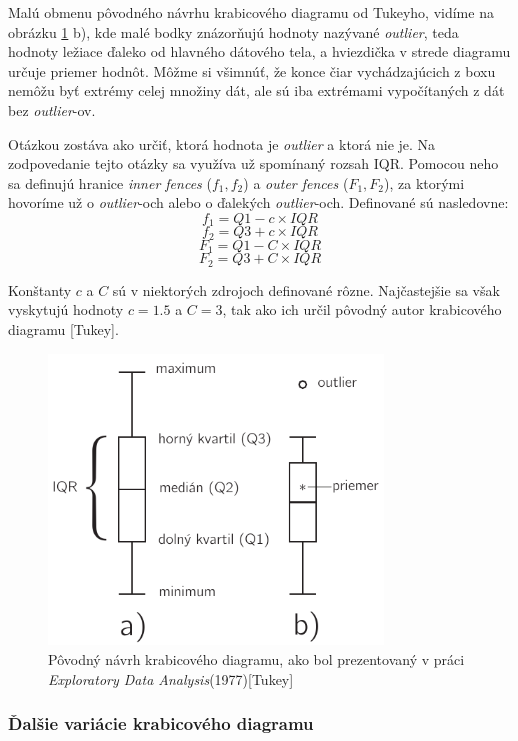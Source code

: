 Malú obmenu pôvodného návrhu krabicového diagramu od Tukeyho, vidíme na obrázku \ref{fig:boxplot} b), kde malé bodky znázorňujú hodnoty nazývané \textit{outlier}, teda hodnoty ležiace ďaleko od hlavného dátového tela, a hviezdička v strede diagramu určuje priemer hodnôt. Môžme si všimnúť, že konce čiar vychádzajúcich z boxu nemôžu byť extrémy celej množiny dát, ale sú iba extrémami vypočítaných z dát bez \textit{outlier}-ov.

Otázkou zostáva ako určiť, ktorá hodnota je \textit{outlier} a ktorá nie je. Na zodpovedanie tejto otázky sa využíva už spomínaný rozsah IQR. Pomocou neho sa definujú hranice \textit{inner fences} ($f_{1}, f_{2}$) a \textit{outer fences} ($F_{1}, F_{2}$), za ktorými hovoríme už o \textit{outlier}-och alebo o ďalekých \textit{outlier}-och. Definované sú nasledovne:
\\
\[f_{1} = Q1 - c \times IQR\]	
\[f_{2} = Q3 + c \times IQR\]
\[F_{1} = Q1 - C \times IQR\]
\[F_{2} = Q3 + C \times IQR\]

Konštanty $ c $ a $ C $ sú v niektorých zdrojoch definované rôzne. Najčastejšie sa však vyskytujú hodnoty $ c = 1.5 $ a $ C = 3$, tak ako ich určil pôvodný autor krabicového diagramu [Tukey].

\begin{figure}
	\centering
	\includegraphics[width = 3.5in]{boxplot}
	\caption{Pôvodný návrh krabicového diagramu, ako bol prezentovaný v práci \textit{Exploratory Data Analysis}(1977)[Tukey] }
	\label{fig:boxplot}
\end{figure}


\subsubsection{Ďalšie variácie krabicového diagramu}

